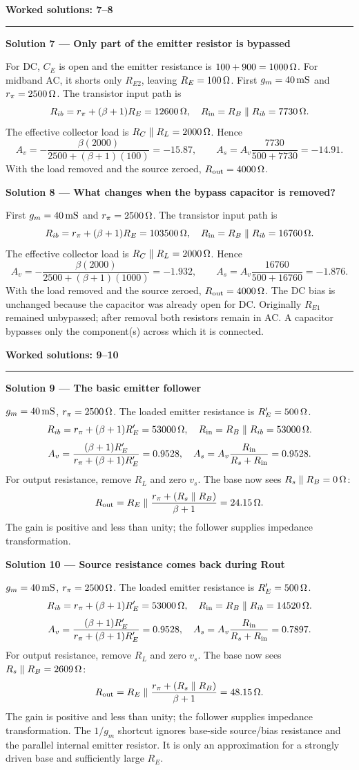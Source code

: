 \documentclass[11pt,a4paper]{article}
\newcommand{\head}[1]{\par{\Large\bfseries\color{ink}#1}\par\vspace{3pt}\hrule\vspace{7pt}}
\newcommand{\sol}[2]{\par{\large\bfseries\color{ink}Solution #1 --- #2}\label{sol:#1}\par}
\begin{document}
\newpage
\head{Worked solutions: 7--8}
\sol{7}{Only part of the emitter resistor is bypassed}For DC, $C_E$ is open and the emitter resistance is $100+900=1000\,\Omega$. For midband AC, it shorts only $R_{E2}$, leaving $R_E=100\,\Omega$. First $g_m=40\,\mathrm{mS}$ and $r_\pi=2500\,\Omega$. The transistor input path is
\[R_{ib}=r_\pi+(\beta+1)R_E=12600\,\Omega,\quad R_{\rm in}=R_B\parallel R_{ib}=7730\,\Omega.\]
The effective collector load is $R_C\parallel R_L=2000\,\Omega$. Hence
\[A_v=-\frac{\beta(2000)}{2500+(\beta+1)(100)}=-15.87,\qquad
A_s=A_v\frac{7730}{500+7730}=-14.91.\]
With the load removed and the source zeroed, $R_{\rm out}=4000\,\Omega$.\par\vfill
\sol{8}{What changes when the bypass capacitor is removed?}First $g_m=40\,\mathrm{mS}$ and $r_\pi=2500\,\Omega$. The transistor input path is
\[R_{ib}=r_\pi+(\beta+1)R_E=103500\,\Omega,\quad R_{\rm in}=R_B\parallel R_{ib}=16760\,\Omega.\]
The effective collector load is $R_C\parallel R_L=2000\,\Omega$. Hence
\[A_v=-\frac{\beta(2000)}{2500+(\beta+1)(1000)}=-1.932,\qquad
A_s=A_v\frac{16760}{500+16760}=-1.876.\]
With the load removed and the source zeroed, $R_{\rm out}=4000\,\Omega$. The DC bias is unchanged because the capacitor was already open for DC. Originally $R_{E1}$ remained unbypassed; after removal both resistors remain in AC. A capacitor bypasses only the component(s) across which it is connected.\par\vfill

\newpage
\head{Worked solutions: 9--10}
\sol{9}{The basic emitter follower}$g_m=40\,\mathrm{mS}$, $r_\pi=2500\,\Omega$. The loaded emitter resistance is $R_E'=500\,\Omega$.
\[R_{ib}=r_\pi+(\beta+1)R_E'=53000\,\Omega,\quad R_{\rm in}=R_B\parallel R_{ib}=53000\,\Omega.\]
\[A_v=\frac{(\beta+1)R_E'}{r_\pi+(\beta+1)R_E'}=0.9528,\quad A_s=A_v\frac{R_{\rm in}}{R_s+R_{\rm in}}=0.9528.\]
For output resistance, remove $R_L$ and zero $v_s$. The base now sees $R_s\parallel R_B=0\,\Omega$:
\[R_{\rm out}=R_E\parallel\frac{r_\pi+(R_s\parallel R_B)}{\beta+1}=24.15\,\Omega.\]
The gain is positive and less than unity; the follower supplies impedance transformation.\par\vfill
\sol{10}{Source resistance comes back during Rout}$g_m=40\,\mathrm{mS}$, $r_\pi=2500\,\Omega$. The loaded emitter resistance is $R_E'=500\,\Omega$.
\[R_{ib}=r_\pi+(\beta+1)R_E'=53000\,\Omega,\quad R_{\rm in}=R_B\parallel R_{ib}=14520\,\Omega.\]
\[A_v=\frac{(\beta+1)R_E'}{r_\pi+(\beta+1)R_E'}=0.9528,\quad A_s=A_v\frac{R_{\rm in}}{R_s+R_{\rm in}}=0.7897.\]
For output resistance, remove $R_L$ and zero $v_s$. The base now sees $R_s\parallel R_B=2609\,\Omega$:
\[R_{\rm out}=R_E\parallel\frac{r_\pi+(R_s\parallel R_B)}{\beta+1}=48.15\,\Omega.\]
The gain is positive and less than unity; the follower supplies impedance transformation. The $1/g_m$ shortcut ignores base-side source/bias resistance and the parallel internal emitter resistor. It is only an approximation for a strongly driven base and sufficiently large $R_E$.\par\vfill
\end{document}
